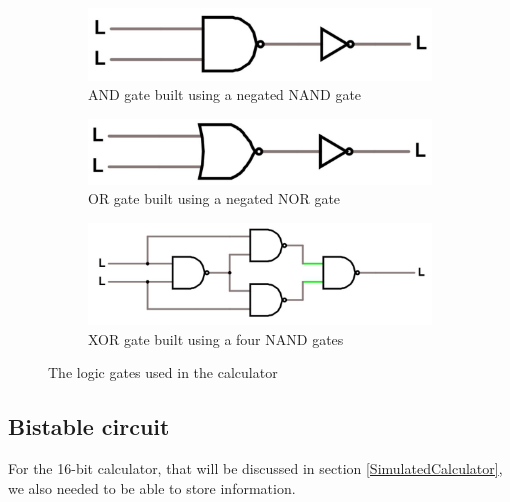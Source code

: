 \documentclass{article}
\begin{document}
\begin{figure}[h]
    \centering
    \begin{subfigure}[h]{\textwidth}
        \centering
        \includegraphics[scale=.3]{IM_AND_LOGIC.JPG}
        \caption{AND gate built using a negated NAND gate}
    \end{subfigure}
    \vspace{2mm}
    \begin{subfigure}[h]{\textwidth}
        \centering
        \includegraphics[scale=.3]{IM_OR_LOGIC.JPG}
        \caption{OR gate built using a negated NOR gate}       
    \end{subfigure}
    \vspace{2mm}
    \begin{subfigure}[h]{\textwidth}
        \centering
        \includegraphics[scale=.3]{IM_XOR_LOGIC.JPG}
        \caption{XOR gate built using a four NAND gates}          
    \end{subfigure}
    \caption{The logic gates used in the calculator}
    \label{UsefulGates}
\end{figure}

\subsection{Bistable circuit}

For the 16-bit calculator, that will be discussed in section \ref{SimulatedCalculator}, we also needed to be able to store information.
\end{document}
